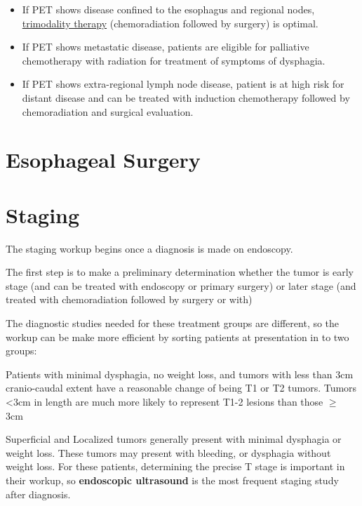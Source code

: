 \documentclass[
]{book}
\providecommand{\tightlist}{%
  \setlength{\itemsep}{0pt}\setlength{\parskip}{0pt}}
\begin{document}
\begin{itemize}
\tightlist
\item
  If PET shows disease confined to the esophagus and regional nodes, \protect\hyperlink{trimodality}{trimodality therapy} (chemoradiation followed by surgery) is optimal.
\item
  If PET shows metastatic disease, patients are eligible for palliative chemotherapy with radiation for treatment of symptoms of dysphagia.
\item
  If PET shows extra-regional lymph node disease, patient is at high risk for distant disease and can be treated with induction chemotherapy followed by chemoradiation and surgical evaluation.
\end{itemize}

\hypertarget{esophagectomy}{%
\chapter{Esophageal Surgery}\label{esophagectomy}}

\hypertarget{staging}{%
\chapter{Staging}\label{staging}}

The staging workup begins once a diagnosis is made on endoscopy.

The first step is to make a preliminary determination whether the tumor is early stage (and can be treated with endoscopy or primary surgery) or later stage (and treated with chemoradiation followed by surgery or with)

The diagnostic studies needed for these treatment groups are different, so the workup can be make more efficient by sorting patients at presentation in to two groups:

Patients with minimal dysphagia, no weight loss, and tumors with less than 3cm cranio-caudal extent have a reasonable change of being T1 or T2 tumors. Tumors \textless3cm in length are much more likely to represent T1-2 lesions than those \(\geq\) 3cm\citep{hollis1114}

Superficial and Localized tumors generally present with minimal dysphagia or weight loss. These tumors may present with bleeding, or dysphagia without weight loss. For these patients, determining the precise T stage is important in their workup, so \textbf{endoscopic ultrasound} is the most frequent staging study after diagnosis.
\end{document}
